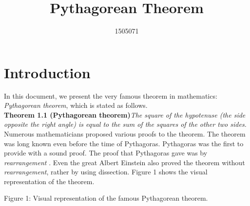 \documentclass{article}
\title{Pythagorean Theorem}
\author{1505071}
\date
\begin{document}
\maketitle

\section{Introduction}
In this document, we present the very famous theorem in mathematics: \textit{Pythagorean 
theorem}, which is stated as follows.
\\
\textbf{Theorem 1.1 (Pythagorean theorem)}\textit{The square of the hypotenuse (the
side opposite the right angle) is equal to the sum of the squares of the other two
sides.}
\\
Numerous  mathematicians  proposed  various  proofs  to  the  theorem.   
The theorem was long known even before the time of Pythagoras.  Pythagoras was
the first to provide with a sound proof.  The proof that Pythagoras gave was
by \textit{rearrangement}
.   Even  the  great  Albert  Einstein  also  proved  the  theorem
without \textit{rearrangement}, rather by using dissection.  Figure 1 shows the visual
representation of the theorem.

\vspace{5mm}

\begin{center} 
\end{center} 

\begin{center}
Figure 1: Visual representation of the famous Pythagorean theorem.
\end{center}
\end{document}
